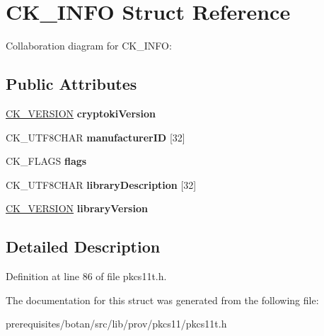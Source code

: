 \hypertarget{struct_c_k___i_n_f_o}{}\section{C\+K\+\_\+\+I\+N\+FO Struct Reference}
\label{struct_c_k___i_n_f_o}


Collaboration diagram for C\+K\+\_\+\+I\+N\+FO\+:
\subsection*{Public Attributes}
\begin{DoxyCompactItemize}
\item 
\mbox{\label{struct_c_k___i_n_f_o_a261d5c79ab4a3579b71aa6df7a69cad5}} 
\mbox{\hyperlink{struct_c_k___v_e_r_s_i_o_n}{C\+K\+\_\+\+V\+E\+R\+S\+I\+ON}} {\bfseries cryptoki\+Version}
\item 
\mbox{\label{struct_c_k___i_n_f_o_ab58e8e4d98ad72aaaa59cad2cc85ea80}} 
C\+K\+\_\+\+U\+T\+F8\+C\+H\+AR {\bfseries manufacturer\+ID} \mbox{[}32\mbox{]}
\item 
\mbox{\label{struct_c_k___i_n_f_o_abac745e390f6328a4a75310d0af2c72a}} 
C\+K\+\_\+\+F\+L\+A\+GS {\bfseries flags}
\item 
\mbox{\label{struct_c_k___i_n_f_o_ac90912a7de0400710fa8a6cf9c8a5dfe}} 
C\+K\+\_\+\+U\+T\+F8\+C\+H\+AR {\bfseries library\+Description} \mbox{[}32\mbox{]}
\item 
\mbox{\label{struct_c_k___i_n_f_o_a6a0708856568d8d64a9da330d2e217a6}} 
\mbox{\hyperlink{struct_c_k___v_e_r_s_i_o_n}{C\+K\+\_\+\+V\+E\+R\+S\+I\+ON}} {\bfseries library\+Version}
\end{DoxyCompactItemize}


\subsection{Detailed Description}


Definition at line 86 of file pkcs11t.\+h.



The documentation for this struct was generated from the following file\+:\begin{DoxyCompactItemize}
\item 
prerequisites/botan/src/lib/prov/pkcs11/pkcs11t.\+h\end{DoxyCompactItemize}
